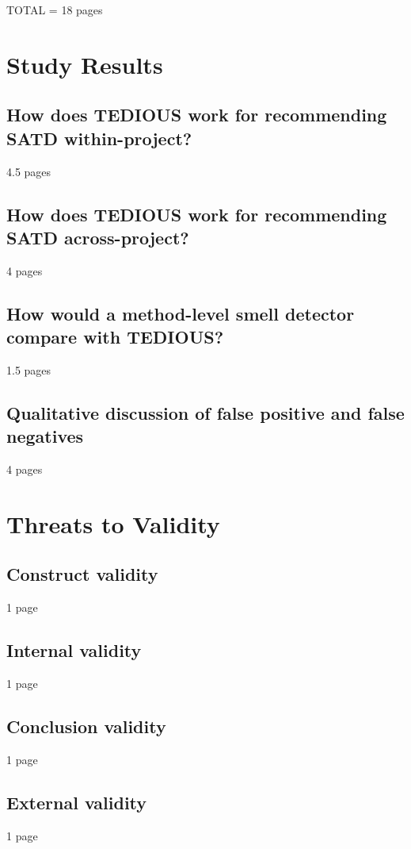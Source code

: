 \label{sec:Theme2}

TOTAL = 18 pages

\section{Study Results}

\subsection{How does TEDIOUS work for recommending SATD within-project?}

4.5 pages

\subsection{How does TEDIOUS work for recommending SATD across-project?}

4 pages

\subsection{How would a method-level smell detector compare with TEDIOUS?}

1.5 pages

\subsection{Qualitative discussion of false positive and false negatives}

4 pages

\section{Threats to Validity}

\subsection{Construct validity}

1 page

\subsection{Internal validity}

1 page

\subsection{Conclusion validity}

1 page

\subsection{External validity}

1 page

